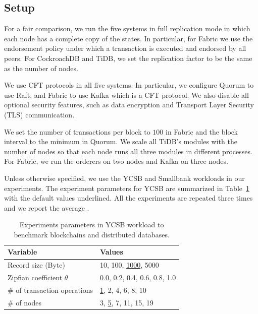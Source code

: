 \subsection{Setup}
For a fair comparison, we run the five systems in full replication mode in which each node has a complete
copy of the states. In particular, for Fabric we use the endorsement policy under which a transaction
is executed and endorsed by all peers. For CockroachDB and TiDB, we set the replication factor to be the
same as the number of nodes. 

We use CFT protocols in all five systems. In particular, we configure Quorum to use Raft, and Fabric to use
Kafka which is a CFT protocol. We also disable all optional security features, such as data encryption and
Transport Layer Security (TLS) communication. 

We set the number of transactions per block to $100$ in Fabric and the block interval to the
minimum in Quorum. We scale all TiDB's modules with the number of nodes so that each node runs all three
modules in different processes. For Fabric, we run the orderers on two nodes and Kafka on three nodes.

Unless otherwise specified, we use the YCSB and Smallbank workloads in our experiments. The experiment
parameters for YCSB are summarized in Table~\ref{twin:tab:parameter} with the default values underlined. 
All the experiments are repeated three times and we report the average .

\begin{table}
	\centering
	\caption{Experiments parameters in YCSB workload to benchmark blockchains and distributed databases. }
	\label{twin:tab:parameter}
	\begin{tabular}{@{}ll@{}}
	\toprule
	\textbf{Variable}               & \textbf{Values}               \\
	\midrule
	Record size (Byte)               & 10, 100, \underline{1000}, 5000          \\
	Zipfian coefficient $\theta$       & \underline{0.0}, 0.2, 0.4, 0.6, 0.8, 1.0 \\
	\# of transaction operations & \underline{1}, 2, 4, 6, 8, 10            \\
	\# of nodes & 3, \underline{5}, 7, 11, 15, 19            \\
	\bottomrule
	\end{tabular}
\end{table}


